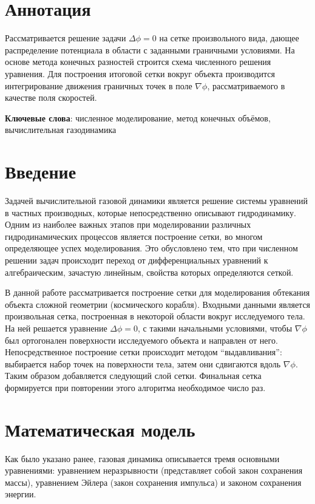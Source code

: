 \documentclass[a4paper,12pt]{article}
\begin{document}


\section*{Аннотация}

Рассматривается решение задачи $\Delta \phi = 0$ на сетке произвольного вида, дающее распределение потенциала в области с заданными граничными условиями. На основе метода конечных разностей строится схема численного решения уравнения. Для построения итоговой сетки вокруг объекта производится интегрирование движения граничных точек в поле $\nabla \phi$, рассматриваемого в качестве поля скоростей.

\textbf{Ключевые слова}: численное моделирование, метод конечных объёмов, вычислительная газодинамика

\section{Введение}

Задачей вычислительной газовой динамики является решение системы уравнений в частных производных, которые непосредственно описывают гидродинамику. Одним из наиболее важных этапов при моделировании различных гидродинамических процессов является построение сетки, во многом определяющее успех моделирования.  Это обусловлено тем, что при численном решении задач происходит переход от дифференциальных уравнений к алгебраическим, зачастую линейным, свойства которых определяются сеткой.

В данной работе рассматривается построение сетки для моделирования обтекания объекта сложной геометрии (космического корабля). Входными данными является произвольная сетка, построенная в некоторой области вокруг исследуемого тела. На ней решается уравнение $\Delta \phi = 0$, с такими начальными условиями, чтобы $\nabla \phi$ был ортогонален поверхности исследуемого объекта и направлен от него. Непосредственное построение сетки происходит методом “выдавливания”: выбирается набор точек на поверхности тела, затем они сдвигаются вдоль $\nabla \phi$. Таким образом добавляется следующий слой сетки. Финальная сетка формируется при повторении этого алгоритма необходимое число раз.

\section{Математическая модель}

Как было указано ранее, газовая динамика описывается тремя основными уравнениями: уравнением неразрывности (представляет собой закон сохранения массы), уравнением Эйлера (закон сохранения импульса) и законом сохранения энергии.
\end{document}
